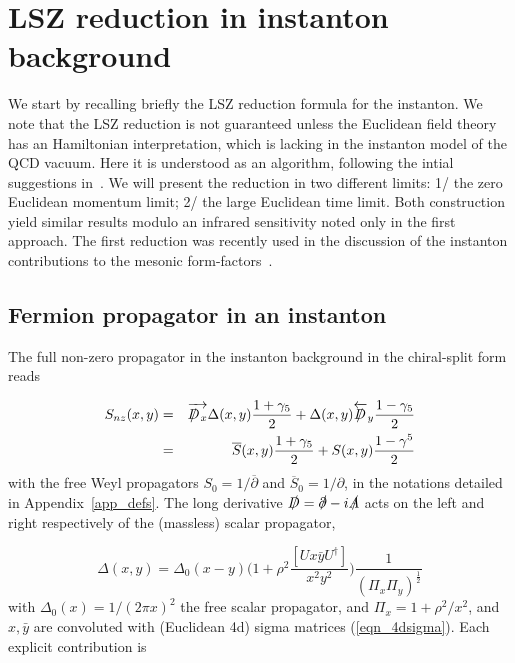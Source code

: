 \documentclass[11pt,aps,amsmath,amssymb,nofootinbib,notitlepage,longbibliography]{revtex4-1}
\newcommand{\Dslash}{D\hspace{-1.6ex}/\hspace{0.6ex} }
\begin{document}
\section{LSZ reduction in instanton background}\label{section_LSZ}

We start by recalling briefly  the LSZ reduction formula for the instanton. We note that the LSZ reduction is not guaranteed unless the Euclidean field theory has an Hamiltonian interpretation, which is lacking in the instanton model of the QCD vacuum. Here it is understood as an algorithm, following the intial suggestions in~\cite{Balitsky:1993ki,Moch:1996bs}. We will present the reduction in two different limits: 1/ the zero Euclidean momentum limit; 2/ the large Euclidean time limit. Both construction yield similar results modulo an infrared sensitivity noted only in the first approach. The first reduction was recently used in the discussion of the 
instanton contributions to the  mesonic form-factors~\cite{Shuryak:2020ktq}. 



\subsection{Fermion propagator in an instanton}

The full non-zero propagator in the instanton background in the chiral-split form reads~\cite{Brown:1977eb}

\begin{eqnarray}
\label{BROWN}
S_{nz}(x,y)= &&\overrightarrow{\Dslash_x}\Delta(x,y) {1+\gamma_5 \over 2} +  \Delta(x,y) \overleftarrow{ \Dslash}_y {1-\gamma_5 \over 2} \nonumber\\
=&& \overline{S}(x,y) \frac{1+\gamma_5}2+{S}(x,y)\frac{1-\gamma^5}2
\end{eqnarray}
with the free Weyl  propagators $S_0=1/\overline{\partial}$ and $\overline{S}_0=1/{\partial}$, in the notations detailed in Appendix~\ref{app_defs}.
The long derivative $\slashed{D}=\slashed{\partial}-i\slashed{A}$ acts on the left and right respectively of the (massless) scalar
propagator,

\begin{equation}
\label{PROSCALAR}
\Delta(x,y) =\Delta_0(x-y)\bigg(1+ \rho^2 \frac{[Ux \bar y U^\dagger]}{x^2 y^2}\bigg) \frac 1{(\Pi_x \Pi_y)^{\frac 12}}
\end{equation}
with $\Delta_0(x)=1/(2\pi x)^2$ the free scalar propagator, and $\Pi_x=1+\rho^2/x^2$, and
$x,\bar y$ are convoluted with (Euclidean 4d) sigma matrices (\ref{eqn_4dsigma}).
Each explicit contribution is
\end{document}
